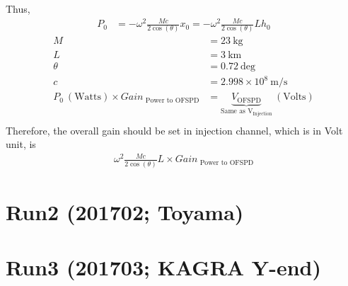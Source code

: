 Thus,
\begin{align}
    P_0 &= -\omega^2 \frac{M c}{2 \cos(\theta)} x_0 = -\omega^2 \frac{M c}{2 \cos(\theta)} L h_0
\end{align}
\begin{align*}
    M &= 23 ~\mathrm{kg} \\
    L &= 3 ~\mathrm{km}  \\
    \theta &= 0.72 ~\mathrm{deg}  \\
    c &= 2.998\times10^8 ~\mathrm{m/s} \\
    P_0 ~(\mathrm{Watts}) \times Gain_{\text{~Power to OFSPD}} &= 
     \underbrace{V_{\text{OFSPD}}}_{\text{Same as V$_{\text{Injection}}$}}~ (\mathrm{Volts}) \\
\end{align*}
Therefore, the overall gain should be set in injection channel, which is in Volt unit, is
\begin{align}
    \omega^2 \frac{M c}{2 \cos(\theta)} L \times Gain_{\text{~Power to OFSPD}} 
\end{align}

\pagebreak

\section{Run2 (201702; Toyama)}

\section{Run3 (201703; KAGRA Y-end)}


